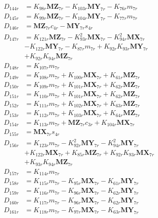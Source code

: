 \begin{multicols}{2}
\begin{align}
D_{144r} &= K_{98r}\mathbf{MZ}_{7r} - K_{103r}\mathbf{MY}_{7r} - K_{76r}m_{7r} \nonumber \\
D_{145r} &= K_{99r}\mathbf{MZ}_{7r} - K_{104r}\mathbf{MY}_{7r} - K_{77r}m_{7r} \nonumber \\
D_{146r} &= \mathbf{MZ}_{7r}c_{4r} - \mathbf{MY}_{7r}s_{4r} \nonumber \\
D_{147r} &= K_{121r}\mathbf{MZ}_{7r} - K_{93r}^2\mathbf{MX}_{7r} - K_{94r}^2\mathbf{MX}_{7r}  \nonumber \\
&- K_{122r}\mathbf{MY}_{7r} - K_{87r}m_{7r} + K_{92r}K_{93r}\mathbf{MY}_{7r}  \nonumber \\
&+ K_{92r}K_{94r}\mathbf{MZ}_{7r} \nonumber \\
D_{148r} &= K_{107r}m_{7r} \nonumber \\
D_{149r} &= K_{108r}m_{7r} + K_{100r}\mathbf{MX}_{7r} + K_{61r}\mathbf{MZ}_{7r} \nonumber \\
D_{150r} &= K_{109r}m_{7r} + K_{101r}\mathbf{MX}_{7r} + K_{62r}\mathbf{MZ}_{7r} \nonumber \\
D_{151r} &= K_{110r}m_{7r} + K_{101r}\mathbf{MX}_{7r} + K_{62r}\mathbf{MZ}_{7r} \nonumber \\
D_{152r} &= K_{111r}m_{7r} + K_{102r}\mathbf{MX}_{7r} + K_{63r}\mathbf{MZ}_{7r} \nonumber \\
D_{153r} &= K_{112r}m_{7r} + K_{103r}\mathbf{MX}_{7r} + K_{64r}\mathbf{MZ}_{7r} \nonumber \\
D_{154r} &= K_{113r}m_{7r} + \mathbf{MZ}_{7r}c_{3r} + K_{104r}\mathbf{MX}_{7r} \nonumber \\
D_{155r} &= \mathbf{MX}_{7r}s_{4r} \nonumber \\
D_{156r} &= K_{123r}m_{7r} - K_{92r}^2\mathbf{MY}_{7r} - K_{94r}^2\mathbf{MY}_{7r}  \nonumber \\
&+ K_{122r}\mathbf{MX}_{7r} + K_{85r}\mathbf{MZ}_{7r} + K_{92r}K_{93r}\mathbf{MX}_{7r}  \nonumber \\
&+ K_{93r}K_{94r}\mathbf{MZ}_{7r} \nonumber \\
D_{157r} &= K_{114r}m_{7r} \nonumber \\
D_{158r} &= K_{115r}m_{7r} - K_{95r}\mathbf{MX}_{7r} - K_{61r}\mathbf{MY}_{7r} \nonumber \\
D_{159r} &= K_{116r}m_{7r} - K_{96r}\mathbf{MX}_{7r} - K_{62r}\mathbf{MY}_{7r} \nonumber \\
D_{160r} &= K_{117r}m_{7r} - K_{96r}\mathbf{MX}_{7r} - K_{62r}\mathbf{MY}_{7r} \nonumber \\
D_{161r} &= K_{118r}m_{7r} - K_{97r}\mathbf{MX}_{7r} - K_{63r}\mathbf{MY}_{7r} \nonumber \\

\end{align}
\end{multicols}
